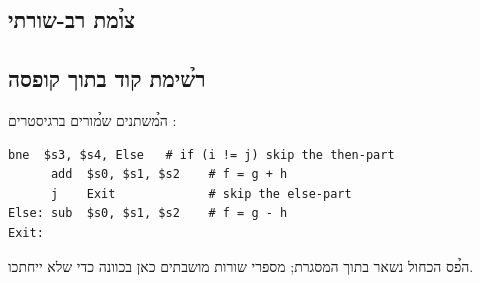 \subsection*{\h{צומת רב-שורתי}}
\begin{tikzpic}
\end{tikzpic}

\subsection*{\h{רשימת קוד בתוך קופסה}}
\begin{exbox}[frametitle={\h{דוגמה} — \code{if (i==j) f=g+h; else f=g-h;}}]
\h{המשתנים}  \h{שמורים ברגיסטרים} :
\begin{asmblock}
\begin{lstlisting}[style=asm]
      bne  $s3, $s4, Else   # if (i != j) skip the then-part
      add  $s0, $s1, $s2    # f = g + h
      j    Exit             # skip the else-part
Else: sub  $s0, $s1, $s2    # f = g - h
Exit:
\end{lstlisting}
\end{asmblock}
\h{הפס הכחול נשאר בתוך המסגרת; מספרי שורות מושבתים כאן בכוונה כדי שלא ייחתכו.}
\end{exbox}

